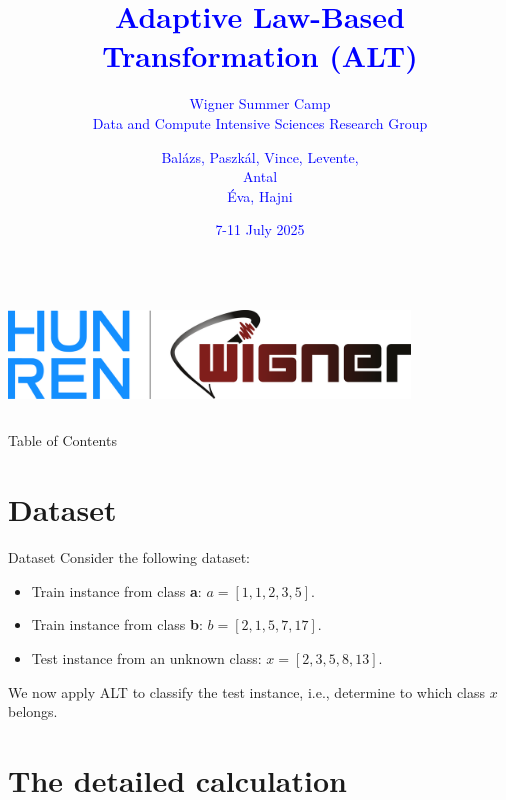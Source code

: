 \documentclass{beamer}
\title{\textcolor{blue}{Adaptive Law-Based Transformation (ALT)}}
\subtitle{\textcolor{blue}{Wigner Summer Camp \\ Data and Compute Intensive Sciences Research Group}}
\author{\textcolor{blue}{Bal\'azs, Paszk\'al, Vince, Levente, \\ Antal \\ \'Eva, Hajni}}
\date{\textcolor{blue}{7-11 July 2025}}
\begin{document}
\begin{frame}
  \titlepage
  \begin{columns}
    \centering
    \includegraphics[width=0.8\textwidth]{../img/logo.png}
  \end{columns}
\end{frame}

\begin{frame}{Table of Contents}
  \tableofcontents
\end{frame}

\section{Dataset}

\begin{frame}{Dataset}
  Consider the following dataset:
  \begin{itemize}
    \item Train instance from class \textbf{a}: \( a = [1, 1, 2, 3, 5] \).
    \item Train instance from class \textbf{b}: \( b = [2, 1, 5, 7, 17] \).
    \item Test instance from an unknown class: \( x = [2, 3, 5, 8, 13] \).
  \end{itemize}
  
  We now apply ALT to classify the test instance, i.e., determine to which class \( x \) belongs.
\end{frame}

\section{The detailed calculation}
\end{document}
